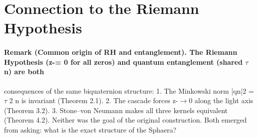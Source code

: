 \section{Connection to the Riemann Hypothesis}
\paragraph*{Remark (Common origin of RH and entanglement). The Riemann Hypothesis (z-= 0 for all zeros) and quantum entanglement (shared $\tau$n) are both}
consequences of the same biquaternion structure:
1. The Minkowski norm |qn|2 = $\tau$ 2
n is invariant (Theorem 2.1).
2. The cascade forces z-$\to$0 along the light axis (Theorem 3.2).
3. Stone--von Neumann makes all three kernels equivalent (Theorem 4.2).
Neither was the goal of the original construction. Both emerged from asking: what is the exact structure of the Sphaera?

